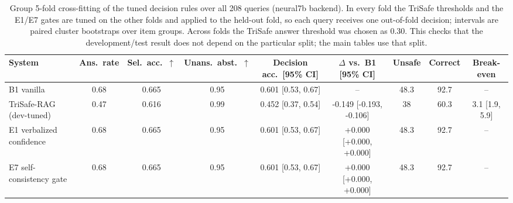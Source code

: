\begin{table}[t]
  \caption{Group 5-fold cross-fitting of the tuned decision rules over all 208 queries (neural7b backend). In every fold the TriSafe thresholds and the E1/E7 gates are tuned on the other folds and applied to the held-out fold, so each query receives one out-of-fold decision; intervals are paired cluster bootstraps over item groups. Across folds the TriSafe answer threshold was chosen as 0.30. This checks that the development/test result does not depend on the particular split; the main tables use that split.}
  \label{tab:cv-neural7b}
  \footnotesize
  \setlength{\tabcolsep}{4pt}
  \begin{tabular}{lcccccccc}
    \toprule
    System & Ans.\ rate & Sel.\ acc.\ $\uparrow$ & Unans.\ abst.\ $\uparrow$ & Decision acc.\ [95\% CI] & $\Delta$ vs.\ B1 [95\% CI] & Unsafe & Correct & Break-even \\
    \midrule
    B1 vanilla & 0.68 & 0.665 & 0.95 & 0.601 [0.53, 0.67] & -- & 48.3 & 92.7 & -- \\
    TriSafe-RAG (dev-tuned) & 0.47 & 0.616 & 0.99 & 0.452 [0.37, 0.54] & -0.149 [-0.193, -0.106] & 38 & 60.3 & 3.1 [1.9, 5.9] \\
    E1 verbalized confidence & 0.68 & 0.665 & 0.95 & 0.601 [0.53, 0.67] & +0.000 [+0.000, +0.000] & 48.3 & 92.7 & -- \\
    E7 self-consistency gate & 0.68 & 0.665 & 0.95 & 0.601 [0.53, 0.67] & +0.000 [+0.000, +0.000] & 48.3 & 92.7 & -- \\
    \bottomrule
  \end{tabular}
\end{table}
